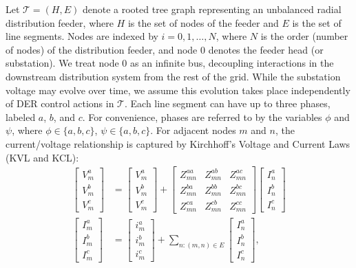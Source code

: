 Let $\mathcal T = (H, E)$ denote a rooted tree graph representing an unbalanced radial distribution feeder, where $H$ is the set of nodes of the feeder and $E$ is the set of line segments.  Nodes are indexed by $i = 0,1,\dots,N$, where $N$ is the order (number of nodes) of the distribution feeder, and node 0 denotes the feeder head (or substation).  We treat node 0 as an infinite bus, decoupling interactions in the downstream distribution system from the rest of the grid.  While the substation voltage may evolve over time, we assume this evolution takes place independently of DER control actions in $\mathcal T$.  Each line segment can have up to three phases, labeled $a$, $b$, and $c$.  For convenience, phases are referred to by the variables $\phi$ and $\psi$, where $\phi \in \{a,b,c \}$, $\psi \in \{a,b,c \}$.  For adjacent nodes $m$ and $n$, the current/voltage relationship is captured by Kirchhoff's Voltage and Current Laws (KVL and KCL):
\begin{align}
	    \begin{bmatrix}
  		V_{m}^{a} \\
  		V_{m}^{b} \\
  		V_{m}^{c}
  	\end{bmatrix}
  	&=
  	\begin{bmatrix}
  		V_{m}^{a} \\
  		V_{m}^{b} \\
  		V_{m}^{c}
  	\end{bmatrix}
  	+
  	\begin{bmatrix}
  		Z^{aa}_{mn} & Z^{ab}_{mn} & Z^{ac}_{mn} \\
  		Z^{ba}_{mn} & Z^{bb}_{mn} & Z^{bc}_{mn} \\
  		Z^{ca}_{mn} & Z^{cb}_{mn} & Z^{cc}_{mn}
  	\end{bmatrix}
  	\begin{bmatrix}
  		I_{n}^{a} \\
  		I_{n}^{b} \\
  		I_{n}^{c}
  	\end{bmatrix} \label{eq:KVL}
    \\
    \begin{bmatrix}
  		I_{m}^{a} \\
  		I_{m}^{b} \\
  		I_{m}^{c}
  	\end{bmatrix}
  	&= \begin{bmatrix}
  		i_{m}^{a} \\
  		i_{m}^{b} \\
  		i_{m}^{c}
  	\end{bmatrix} + \sum_{n:(m,n) \in E}
  	\begin{bmatrix}
  		I_{n}^{a} \\
  		I_{n}^{b} \\
  		I_{n}^{c}
  	\end{bmatrix}\label{eq:KCL},
\end{align}
